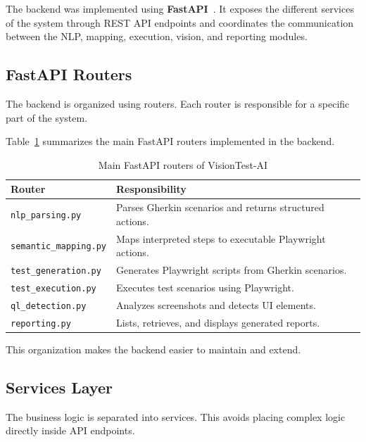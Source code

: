The backend was implemented using \textbf{FastAPI}~\cite{fastapi_docs}. It exposes the different services of the system through REST API endpoints and coordinates the communication between the NLP, mapping, execution, vision, and reporting modules.

\subsection{FastAPI Routers}
\label{subsec:fastapi_routers}

The backend is organized using routers. Each router is responsible for a specific part of the system.

Table~\ref{tab:fastapi_routers} summarizes the main FastAPI routers implemented in the backend.

\begin{table}[H]
	\centering
	\caption{Main FastAPI routers of VisionTest-AI}
	\label{tab:fastapi_routers}
	\renewcommand{\arraystretch}{1.35}
	\small
	\begin{tabularx}{\textwidth}{|l|X|}
		\hline
		\rowcolor{gray!20}
		\textbf{Router} & \textbf{Responsibility} \\ \hline
		\texttt{nlp\_parsing.py} & Parses Gherkin scenarios and returns structured actions. \\ \hline
		\texttt{semantic\_mapping.py} & Maps interpreted steps to executable Playwright actions. \\ \hline
		\texttt{test\_generation.py} & Generates Playwright scripts from Gherkin scenarios. \\ \hline
		\texttt{test\_execution.py} & Executes test scenarios using Playwright. \\ \hline
		\texttt{ql\_detection.py} & Analyzes screenshots and detects UI elements. \\ \hline
		\texttt{reporting.py} & Lists, retrieves, and displays generated reports. \\ \hline
	\end{tabularx}
\end{table}

This organization makes the backend easier to maintain and extend.

\subsection{Services Layer}
\label{subsec:services_layer}

The business logic is separated into services. This avoids placing complex logic directly inside API endpoints.

